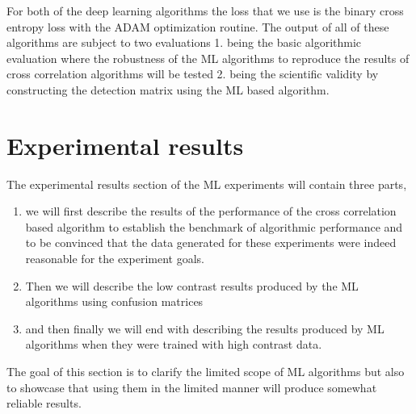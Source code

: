 For both of the deep learning algorithms the loss that we use is the binary cross entropy loss with the ADAM optimization routine.
The output of all of these algorithms are subject to two evaluations 1. being the basic algorithmic evaluation where the robustness of the ML algorithms to reproduce the results of cross correlation algorithms will be tested 2. being the scientific validity by constructing the detection matrix using the ML based algorithm.

\section{ Experimental results}
\label{sec:ML results}
The experimental results section of the ML experiments will contain three parts,
\begin{enumerate}
    \item we will first describe the results of the performance of the cross correlation based algorithm to establish the benchmark of algorithmic performance and to be convinced that the data generated for these experiments were indeed reasonable for the experiment goals.
    \item Then we will describe the low contrast results produced by the ML algorithms using confusion matrices
    \item and then finally we will end with describing the results produced by ML algorithms when they were trained with high contrast data.
\end{enumerate}
The goal of this section is to clarify the limited scope of ML algorithms but also to showcase that using them in the limited manner will produce somewhat reliable results.
